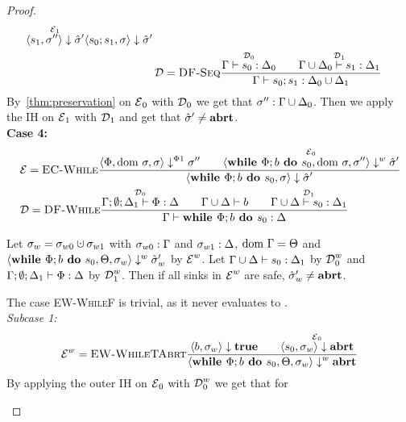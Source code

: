 \begin{proof}
\begin{align*}
{        \overset{\operatorname{\mathcal{E}}_1}{\langle s_1, \sigma'' \rangle \downarrow \hat{\sigma}'}}
        {\langle {s_0}; {s_1}, \sigma \rangle \downarrow \hat{\sigma}'}\\    
        &\operatorname{\mathcal{D}} = \textsc{DF-Seq}\frac{\displaystyle \overset{\operatorname{\mathcal{D}}_0}{\Gamma \vdash {s_0}: \Delta_0}\qquad
        \overset{\operatorname{\mathcal{D}}_1}{\Gamma \cup \Delta_0 \vdash {s_1}: \Delta_1}}{\displaystyle \Gamma \vdash {{s_0}; {s_1}}: \Delta_0 \cup \Delta_1}
    \end{align*}
    By~\autoref{thm:preservation} on $\operatorname{\mathcal{E}}_0$ with $\operatorname{\mathcal{D}}_0$ we get that ${\sigma''}:{\Gamma \cup \Delta_0}$.
    Then we apply the IH on $\operatorname{\mathcal{E}}_1$ with $\operatorname{\mathcal{D}}_1$ and get that $\hat{\sigma}{}' \neq \textbf{abrt}$.\\
    \textbf{Case 4:}
    \begin{align*}
        &\operatorname{\mathcal{E}} = \textsc{EC-While}\frac{\displaystyle \langle \Phi, \text{dom }{\sigma}, \sigma \rangle \downarrow^{\Phi1} \sigma'' \qquad
        \overset{\operatorname{\mathcal{E}}_0}{\langle \textbf{while }\Phi;{b} \textbf{ do } {s_0}, \text{dom }{\sigma}, \sigma'' \rangle \downarrow^w \hat{\sigma}'}}{\displaystyle \langle \textbf{while }\Phi;{b} \textbf{ do } {s_0}, \sigma \rangle \downarrow \hat{\sigma}'}\\
        &\operatorname{\mathcal{D}} = \textsc{DF-While}\frac{\displaystyle \overset{\operatorname{\mathcal{D}}_0}{\Gamma;\emptyset;\Delta_1 \vdash {\Phi}: \Delta}\qquad
        \Gamma \cup \Delta \vdash {b}\qquad
        \overset{\operatorname{\mathcal{D}}_1}{\Gamma \cup \Delta \vdash {s_0}: \Delta_1}}{\displaystyle \Gamma \vdash {\textbf{while }\Phi;{b} \textbf{ do } {s_0}}: \Delta}
    \end{align*}
    \begin{claim}
        Let $\store_w = \store_{w0} \dunion \store_{w1}$ with
        ${\sigma_{w0}}:{\Gamma}$ and ${\sigma_{w1}}:{\Delta}$,
         $\text{dom }{\Gamma} = \Theta$ and
        $\langle \textbf{while }\Phi;{b} \textbf{ do } {s_0}, \Theta, \sigma_w \rangle \downarrow^w \hat{\sigma}{}'_w$ by $\operatorname{\mathcal{E}}^w$.
        Let $\Gamma \cup \Delta \vdash {s_0}: \Delta_1$ by $\operatorname{\mathcal{D}}^w_0$
        and $\Gamma;\emptyset;\Delta_1 \vdash {\Phi}: \Delta$ by $\operatorname{\mathcal{D}}^w_1$.
        Then if all sinks in $\operatorname{\mathcal{E}}^w$ are safe, $\hat{\sigma}{}'_w \neq \textbf{abrt}$.
    \end{claim}
    \begin{claimproof}
        The case \textsc{EW-WhileF} is trivial, as it never evaluates to \exception.\\
        \emph{Subcase 1:}
        \begin{align*}
            \operatorname{\mathcal{E}}^w = \textsc{EW-WhileTAbrt}\frac{\displaystyle \langle b, \sigma_w \rangle \downarrow \textbf{true} \qquad 
            \overset{\operatorname{\mathcal{E}}_0}{\langle s_0, \sigma_w \rangle \downarrow \textbf{abrt}}}{\displaystyle \langle \textbf{while }\Phi;{b} \textbf{ do } {s_0}, \Theta, \sigma_w \rangle \downarrow^w \textbf{abrt}}
        \end{align*}
        By applying the outer IH on $\operatorname{\mathcal{E}}_0$ with $\operatorname{\mathcal{D}}^w_0$ we get that for 

\end{claimproof}
\end{proof}
